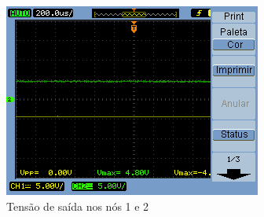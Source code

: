 \documentclass[a4paper]{article} %
\begin{document}
\newpage
\begin{figure}[h!]
\begin{centering}
\includegraphics[scale=0.7]{Imagens/3.4duplicador_tensao/423} \caption{Tensão de saída nos nós 1 e 2 \label{fig:dob-no12}}
\par\end{centering}
\end{figure}

\begin{figure}[h!]
\begin{centering}
\par\end{centering}
\end{figure}
\end{document}
